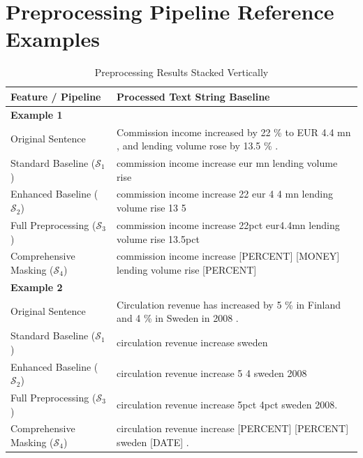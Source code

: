\documentclass[manuscript,screen,review, nonacm]{acmart}
\begin{document}
\section{Preprocessing Pipeline Reference Examples}
\label{app:preprocessing_examples}
\begin{table}[H]
\centering
\caption{Preprocessing Results Stacked Vertically}
\label{tab:preprocessing_stacked_vertical}
\small
\begin{tabular}{lp{12cm}}
\toprule
\textbf{Feature / Pipeline} & \textbf{Processed Text String Baseline} \\
\midrule
\textbf{Example 1} & \\
Original Sentence & Commission income increased by 22 \% to EUR 4.4 mn , and lending volume rose by 13.5 \% . \\
Standard Baseline ($\mathcal{S}_1$) & commission income increase eur mn lending volume rise \\
Enhanced Baseline ($\mathcal{S}_2$) & commission income increase 22 eur 4 4 mn lending volume rise 13 5 \\
Full Preprocessing ($\mathcal{S}_3$) & commission income increase 22pct eur4.4mn lending volume rise 13.5pct \\
Comprehensive Masking ($\mathcal{S}_4$) & commission income increase [PERCENT] [MONEY] lending volume rise [PERCENT] \\
\midrule
\textbf{Example 2} & \\
Original Sentence & Circulation revenue has increased by 5 \% in Finland and 4 \% in Sweden in 2008 . \\
Standard Baseline ($\mathcal{S}_1$) & circulation revenue increase sweden \\
Enhanced Baseline ($\mathcal{S}_2$) & circulation revenue increase 5 4 sweden 2008 \\
Full Preprocessing ($\mathcal{S}_3$) & circulation revenue increase 5pct 4pct sweden 2008. \\
Comprehensive Masking ($\mathcal{S}_4$) & circulation revenue increase [PERCENT] [PERCENT] sweden [DATE] . \\
\bottomrule
\end{tabular}
\end{table}
\end{document}
